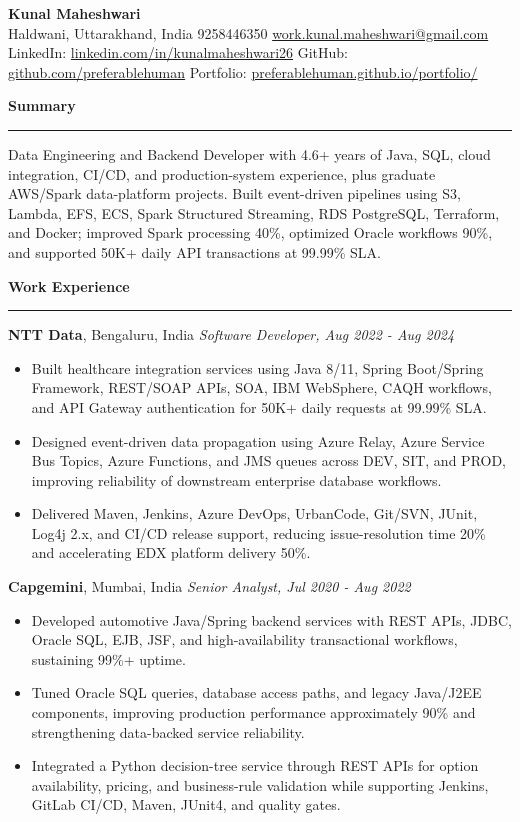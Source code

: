 \documentclass[10pt,letterpaper]{article}
\newcommand{\ressection}[1]{\vspace{3pt}\par\textbf{#1}\par\vspace{1pt}\hrule\vspace{2pt}}
\begin{document}
\pagestyle{empty}\raggedright\fontsize{10.05}{10.95}\selectfont

{\Large \textbf{Kunal Maheshwari}}\\
Haldwani, Uttarakhand, India \textbar{} 9258446350 \textbar{} \href{mailto:work.kunal.maheshwari@gmail.com}{work.kunal.maheshwari@gmail.com}\\
LinkedIn: \href{https://www.linkedin.com/in/kunalmaheshwari26}{linkedin.com/in/kunalmaheshwari26} \textbar{} GitHub: \href{https://github.com/preferablehuman}{github.com/preferablehuman} \textbar{} Portfolio: \href{https://preferablehuman.github.io/portfolio/}{preferablehuman.github.io/portfolio/}

\ressection{Summary}
Data Engineering and Backend Developer with 4.6+ years of Java, SQL, cloud integration, CI/CD, and production-system experience, plus graduate AWS/Spark data-platform projects. Built event-driven pipelines using S3, Lambda, EFS, ECS, Spark Structured Streaming, RDS PostgreSQL, Terraform, and Docker; improved Spark processing 40\%, optimized Oracle workflows 90\%, and supported 50K+ daily API transactions at 99.99\% SLA.

\ressection{Work Experience}
\textbf{NTT Data}, Bengaluru, India \hfill \textit{Software Developer, Aug 2022 - Aug 2024}
\begin{itemize}
  \item Built healthcare integration services using Java 8/11, Spring Boot/Spring Framework, REST/SOAP APIs, SOA, IBM WebSphere, CAQH workflows, and API Gateway authentication for 50K+ daily requests at 99.99\% SLA.
  \item Designed event-driven data propagation using Azure Relay, Azure Service Bus Topics, Azure Functions, and JMS queues across DEV, SIT, and PROD, improving reliability of downstream enterprise database workflows.
  \item Delivered Maven, Jenkins, Azure DevOps, UrbanCode, Git/SVN, JUnit, Log4j 2.x, and CI/CD release support, reducing issue-resolution time 20\% and accelerating EDX platform delivery 50\%.
\end{itemize}
\textbf{Capgemini}, Mumbai, India \hfill \textit{Senior Analyst, Jul 2020 - Aug 2022}
\begin{itemize}
  \item Developed automotive Java/Spring backend services with REST APIs, JDBC, Oracle SQL, EJB, JSF, and high-availability transactional workflows, sustaining 99\%+ uptime.
  \item Tuned Oracle SQL queries, database access paths, and legacy Java/J2EE components, improving production performance approximately 90\% and strengthening data-backed service reliability.
  \item Integrated a Python decision-tree service through REST APIs for option availability, pricing, and business-rule validation while supporting Jenkins, GitLab CI/CD, Maven, JUnit4, and quality gates.
\end{itemize}
\end{document}
